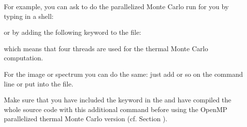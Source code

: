 \documentclass[letterpaper,10pt,english]{sphinxmanual}
\begin{document}
For example, you can ask  to do the parallelized Monte
Carlo run for you by typing in a shell:

\begin{sphinxVerbatim}[commandchars=\\\{\}]
   
\end{sphinxVerbatim}

or by adding the following keyword to the  file:

\begin{sphinxVerbatim}[commandchars=\\\{\}]
  
\end{sphinxVerbatim}

which means that four threads are used for the thermal Monte Carlo computation.

For the image or spectrum you can do the same: just add  or so
on the command line or put  into the  file.

Make sure that you have included the  keyword in the 
and have compiled the whole  source code with this additional command
before using the OpenMP parallelized thermal Monte Carlo version (cf. Section
{\hyperref[\detokenize{installation:sec-makeing}]{}}).
\end{document}
